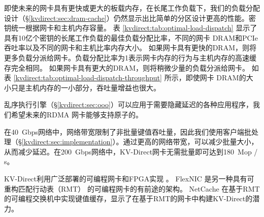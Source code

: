 \begin{table}[t]
\centering
{}
\caption{与简单分区相比，负载分派的相对吞吐量。 列标题与表格相同~\ref{kvdirect:tab:optimal-load-dispatch}。}
\label{kvdirect:tab:optimal-load-dispatch-throughput}

\end{table}


即使未来的网卡具有更快或更大的板载内存，在长尾工作负载下，我们的负载分配设计（\S \ref {kvdirect:sec:dram-cache}）仍然显示出比简单的分区设计更高的性能。密钥统一根据网卡和主机内存容量。
表 \ref {kvdirect:tab:optimal-load-dispatch} 显示了具有10亿个密钥的长尾工作负载的最佳负载分配比率，不同的网卡 DRAM和PCIe吞吐率以及不同的网卡和主机比率内存大小。
如果网卡具有更快的DRAM，则将更多负载分派给网卡。负载分配比率为1表示网卡内存的行为与主机内存的高速缓存完全相同。
如果网卡具有更大的DRAM，则将稍微少量的负载分派给网卡。
如表 \ref {kvdirect:tab:optimal-load-dispatch-throughput} 所示，即使网卡 DRAM的大小只是主机内存的一小部分，吞吐量增益也很大。

乱序执行引擎（\S \ref {kvdirect:sec:ooo}）可以应用于需要隐藏延迟的各种应用程序，我们希望未来的RDMA 网卡能够支持原子的。

在40~Gbps网络中，网络带宽限制了非批量键值吞吐量，因此我们使用客户端批处理（\S \ref {kvdirect:sec:implementation}）。通过更高的网络带宽，可以减少批量大小，从而减少延迟。在200~Gbps网络中，KV-Direct网卡无需批量即可达到180~Mop / s。

KV-Direct利用广泛部署的可编程网卡和FPGA实现 \cite{putnam2014reconfigurable,caulfield2016cloud}。 FlexNIC \cite {kaufmann2015flexnic,kaufmann2016krishnamurthy} 是另一种具有可重构匹配行动表（RMT） \cite {bosshart2013forwarding} 的可编程网卡的有前途的架构。
NetCache \cite {netcache-sosp17} 在基于RMT的可编程交换机中实现键值缓存，显示了在基于RMT的网卡中构建KV-Direct的潜力。

